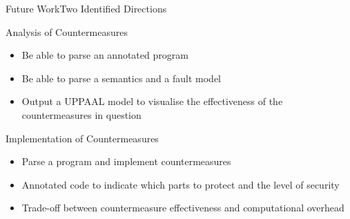 \begin{frame}{Future Work}{Two Identified Directions}
\begin{block}{Analysis of Countermeasures}
\begin{itemize}
\item Be able to parse an annotated program
\item Be able to parse a semantics and a fault model
\item Output a UPPAAL model to visualise the effectiveness of the countermeasures in question
\end{itemize}
\end{block}
\begin{block}{Implementation of Countermeasures}
\begin{itemize}
\item Parse a program and implement countermeasures
\item Annotated code to indicate which parts to protect and the level of security
\item Trade-off between countermeasure effectiveness and computational overhead
\end{itemize}
\end{block}
\end{frame}


